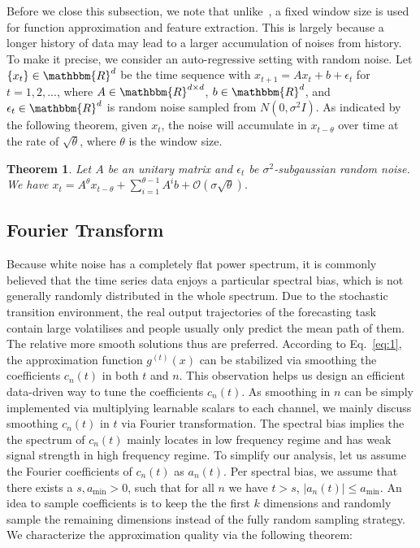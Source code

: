 \documentclass{article}
\newtheorem{theorem}{Theorem}
\begin{document}
Before we close this subsection, we note that unlike~\cite{S4}, a fixed window size is used for function approximation and feature extraction. This is largely because a longer history of data may lead to a larger accumulation of noises from history. To make it precise, we consider an auto-regressive setting with random noise. Let $\{x_t\}\in \mathbbm{R}^d$ be the time sequence with $x_{t+1} = Ax_t + b + \epsilon_t$ for $t=1,2,...$, where $A\in\mathbbm{R}^{d\times d}$, $b \in \mathbbm{R}^d$, and $\epsilon_t\in\mathbbm{R}^{d}$ is random noise sampled from $N(0, {\sigma^2 I})$. As indicated by the following theorem, given $x_t$, the noise will accumulate in $x_{t-\theta}$ over time at the rate of $\sqrt{\theta}$, where $\theta$ is the window size.

\begin{theorem}
Let $A$ be an unitary matrix and $\epsilon_t$ be $\sigma^2$-subgaussian random noise.  We have $x_{t} = A^{\theta}x_{t-\theta} + \sum_{i=1}^{\theta-1}A^{i}b + \mathcal{O}(\sigma \sqrt{\theta})$.
\end{theorem}








\subsection{Fourier Transform}
Because white noise has a completely flat power spectrum, it is commonly believed that the time series data enjoys a particular spectral bias, which is not generally randomly distributed in the whole spectrum.
Due to the stochastic transition environment, the real output trajectories of the forecasting task contain large volatilises and people usually only predict the mean path of them. The relative more smooth solutions thus are preferred. According to Eq.~\eqref{eq:1},  the approximation function $g^{(t)}(x)$ can be stabilized via smoothing the coefficients $c_n(t)$ in both $t$ and $n$. This observation helps us design an efficient data-driven way to tune the coefficients $c_n(t)$. As smoothing in $n$ can be simply implemented via multiplying learnable scalars to each channel, we mainly discuss smoothing $c_n(t)$ in $t$ via Fourier transformation. The spectral bias implies the the spectrum of $c_n(t)$ mainly locates in low frequency regime and has weak signal strength in high frequency regime. To simplify our analysis, let us assume the Fourier coefficients of $c_{n}(t)$ as $a_{n}(t)$. Per spectral bias, we assume that there exists a $s, a_{\min}>0$, such that for all $n$ we have $t> s$, $|a_{n}(t)|\le a_{\min}$. An idea to sample coefficients is to keep the the first $k$ dimensions and randomly sample the remaining dimensions instead of the fully random sampling strategy. We characterize the approximation quality via the following theorem:
\end{document}
